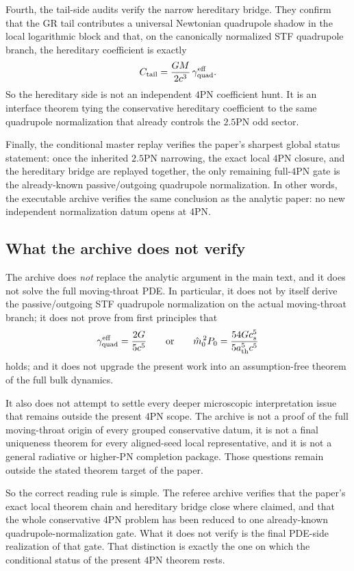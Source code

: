 \documentclass[11pt]{article}
\begin{document}
Fourth, the tail-side audits verify the narrow hereditary bridge.  They confirm
that the GR tail contributes a universal Newtonian quadrupole shadow in the
local logarithmic block and that, on the canonically normalized STF quadrupole
branch, the hereditary coefficient is exactly
\[
C_{\rm tail}=\frac{GM}{2c^3}\,\gamma_{\rm quad}^{\rm eff}.
\]
So the hereditary side is not an independent $4$PN coefficient hunt.  It is an
interface theorem tying the conservative hereditary coefficient to the same
quadrupole normalization that already controls the $2.5$PN odd sector.

Finally, the conditional master replay verifies the paper's sharpest global
status statement: once the inherited $2.5$PN narrowing, the exact local $4$PN
closure, and the hereditary bridge are replayed together, the only remaining
full-$4$PN gate is the already-known passive/outgoing quadrupole normalization.
In other words, the executable archive verifies the same conclusion as the
analytic paper: no new independent normalization datum opens at $4$PN.

\subsection{What the archive does not verify}
\label{app:verification-what-not-verify}

The archive does \emph{not} replace the analytic argument in the main text, and
it does not solve the full moving-throat PDE.  In particular, it does not by
itself derive the passive/outgoing STF quadrupole normalization on the actual
moving-throat branch; it does not prove from first principles that
\[
\gamma_{\rm quad}^{\rm eff}=\frac{2G}{5c^5}
\qquad\text{or}\qquad
\hat m_0^{\,2}P_0=\frac{54Gc_s^5}{5a_{\rm th}^5c^5}
\]
holds; and it does not upgrade the present work into an assumption-free theorem
of the full bulk dynamics.

It also does not attempt to settle every deeper microscopic interpretation issue
that remains outside the present $4$PN scope.  The archive is not a proof of
the full moving-throat origin of every grouped conservative datum, it is not a
final uniqueness theorem for every aligned-seed local representative, and it is
not a general radiative or higher-PN completion package.  Those questions remain
outside the stated theorem target of the paper.

So the correct reading rule is simple.  The referee archive verifies that the
paper's exact local theorem chain and hereditary bridge close where claimed, and
that the whole conservative $4$PN problem has been reduced to one already-known
quadrupole-normalization gate.  What it does not verify is the final PDE-side
realization of that gate.  That distinction is exactly the one on which the
conditional status of the present $4$PN theorem rests.
\end{document}

